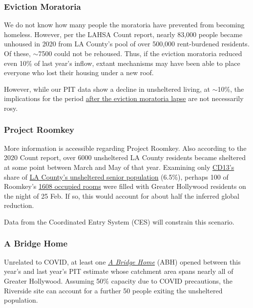 \documentclass[11pt,twocolumn]{article}
\begin{document}
\subsubsection{Eviction Moratoria}

We do not know how many people the moratoria have prevented from becoming homeless. However,
per the LAHSA Count report, nearly 83,000 people became unhoused in 2020 from LA County's pool 
of over 500,000 rent-burdened residents. Of these, $\sim$7500 could not be rehoused. Thus, if the eviction
moratoria reduced even 10\% of last year's inflow, extant mechanisms may have been able to place 
everyone who lost their housing under a new roof.

However, while our PIT data show a decline in unsheltered living, at $\sim$10\%, the implications for 
the period \href{https://www.latimes.com/california/story/2021-01-12/new-report-foresees-tens-of-thousands-losing-homes-by-2023}
{after the eviction moratoria lapse} are not necessarily rosy.

\subsubsection{Project Roomkey}

More information is accessible regarding Project Roomkey. Also according to the 2020 Count report, 
over 6000 unsheltered LA County residents became sheltered at some point between March and May of that year.
Examining only \href{https://www.lahsa.org/documents?id=4672-2020-homeless-count-council-district-13}
{CD13's} share of \href{https://www.lahsa.org/documents?id=4585-2020-greater-los-angeles-homeless-count-los-angeles-continuum-of-care-coc-}{LA County's unsheltered senior population} (6.5\%), perhaps 100 of Roomkey's 
\href{https://projectroomkeytracker.com/}{1608 occupied rooms} were filled with Greater Hollywood residents 
on the night of 25 Feb. If so, this would account for about half the inferred global reduction. 

Data from the Coordinated Entry System (CES) will constrain this scenario.

\subsubsection{A Bridge Home}

Unrelated to COVID, at least one \href{https://www.lamayor.org/ABridgeHome}{\it A Bridge Home} (ABH) 
opened between this year's and last year's PIT estimate whose catchment area spans nearly all of Greater 
Hollywood. Assuming 50\% capacity due to COVID precautions, the Riverside site can account for a further 
50 people exiting the unsheltered population.
\end{document}
